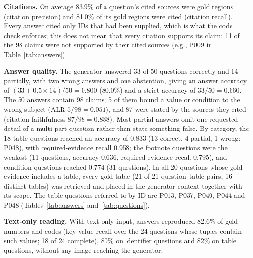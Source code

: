\documentclass[runningheads]{llncs}
\begin{document}
\textbf{Citations.} On average 83.9\% of a question's cited sources were gold regions (citation precision) and 81.0\% of its gold regions were cited (citation recall). Every answer cited only IDs that had been supplied, which is what the code check enforces; this does not mean that every citation supports its claim: 11 of the 98 claims were not supported by their cited sources (e.g., P009 in Table~\ref{tab:answers}).

\textbf{Answer quality.} The generator answered 33 of 50 questions correctly and 14 partially, with two wrong answers and one abstention, giving an answer accuracy of $(33 + 0.5\times 14)/50 = 0.800$ (80.0\%) and a strict accuracy of $33/50 = 0.660$. The 50 answers contain 98 claims; 5 of them bound a value or condition to the wrong subject (ALR $5/98 = 0.051$), and 87 were stated by the sources they cited (citation faithfulness $87/98 = 0.888$). Most partial answers omit one requested detail of a multi-part question rather than state something false. By category, the 18 table questions reached an accuracy of 0.833 (13 correct, 4 partial, 1 wrong: P048), with required-evidence recall 0.958; the footnote questions were the weakest (11 questions, accuracy 0.636, required-evidence recall 0.795), and condition questions reached 0.774 (31 questions). In all 20 questions whose gold evidence includes a table, every gold table (21 of 21 question--table pairs, 16 distinct tables) was retrieved and placed in the generator context together with its scope. The table questions referred to by ID are P013, P037, P040, P044 and P048 (Tables~\ref{tab:answers} and~\ref{tab:questions}).

\textbf{Text-only reading.} With text-only input, answers reproduced 82.6\% of gold numbers and codes (key-value recall over the 24 questions whose tuples contain such values; 18 of 24 complete), 80\% on identifier questions and 82\% on table questions, without any image reaching the generator.
\end{document}
